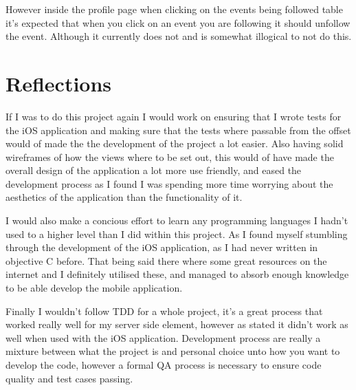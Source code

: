 	However inside the profile page when clicking on the events being followed table it's expected that when you click on an event you are following it should unfollow the event. Although it currently does not and is somewhat illogical to not do this.  

\section{Reflections}
	If I was to do this project again I would work on ensuring that I wrote tests for the iOS application and making sure that the tests where passable from the offset would of made the the development of the project a lot easier. Also having solid wireframes of how the views where to be set out, this would of have made the overall design of the application a lot more use friendly, and eased the development process as I found I was spending more time worrying about the aesthetics of the application than the functionality of it. 

	I would also make a concious effort to learn any programming languages I hadn't used to a higher level than I did within this project. As I found myself stumbling through the development of the iOS application, as I had never written in objective C before. That being said there where some great resources on the internet and I definitely utilised these, and managed to absorb enough knowledge to be able develop the mobile application. 

	Finally I wouldn't follow TDD for a whole project, it's a great process that worked really well for my server side element, however as stated it didn't work as well when used with the iOS application. Development process are really a mixture between what the project is and personal choice unto how you want to develop the code, however a formal QA  process is necessary to ensure code quality and test cases passing. 
